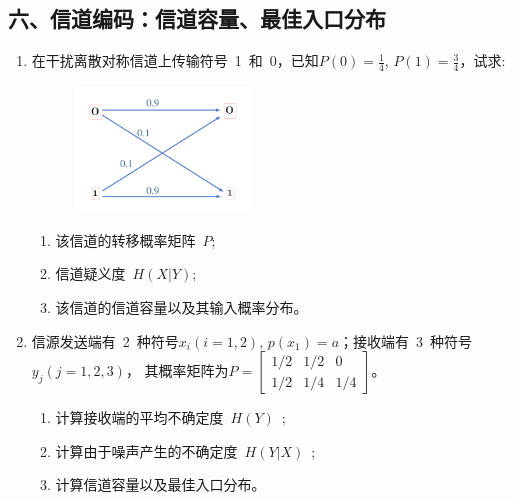 \documentclass[normal,cyan]{elegantnote}
\begin{document}
\subsection*{六、信道编码：信道容量、最佳入口分布}
\begin{enumerate}
    \item 在干扰离散对称信道上传输符号~1~和~0，已知$P(0)=\frac{1}{4}$, $P(1)=\frac{3}{4}$，试求:
    \begin{figure}[H]
        \centering
        \includegraphics[width=0.45\textwidth]{figure/fig5.pdf}
    \end{figure}
    \begin{enumerate}
        \item 该信道的转移概率矩阵~$P$;
         \vspace*{0.3cm}
        \item 信道疑义度~$H(X|Y)$;
         \vspace*{0.3cm}
        \item 该信道的信道容量以及其输入概率分布。
    \end{enumerate}
    \vspace*{0.8cm}
    \item 信源发送端有~2~种符号$x_i(i=1,2)$, $p(x_1)=a$；接收端有~3~种符号$y_j(j=1,2,3)$，
    其概率矩阵为$P=\begin{bmatrix}
        1/2 & 1/2 & 0\\
        1/2 & 1/4 & 1/4
    \end{bmatrix}$。
    \begin{enumerate}
        \item 计算接收端的平均不确定度~$H(Y)$~;
        \vspace*{0.3cm}
        \item 计算由于噪声产生的不确定度~$H(Y|X)$~;
        \vspace*{0.3cm}
        \item 计算信道容量以及最佳入口分布。
    \end{enumerate}
\end{enumerate}
\end{document}
